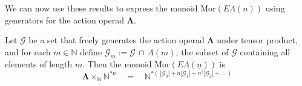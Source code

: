 \documentclass{amsbook} %
\newcommand{\ML}{\mathbf{\Lambda}}
\newcommand{\ELn}{E\Lambda(\underline{n})}
\numberwithin{section}{chapter}
\begin{document}

We can now use these results to express the monoid $\mathrm{Mor}(\ELn)$ using generators for the action operad $\ML$.

\begin{prop} \label{freemor} Let $\mathcal{G}$ be a set that freely generates the action operad $\ML$ under tensor product, and for each $m \in \mathbb{N}$ define $\mathcal{G}_m := \mathcal{G} \, \cap \,  \Lambda(m)$, the subset of $\mathcal{G}$ containing all elements of length $m$. Then the monoid $\mathrm{Mor}(\ELn)$ is 
\[ \ML \times_{\mathbb{N}} \mathbb{N}^{\ast n} \quad = \quad \mathbb{N}^{\ast ( \, |\mathcal{G}_0| + n|\mathcal{G}_1| + n^2 |\mathcal{G}_2| + ... \, )} \]
\end{prop}
\end{document}

